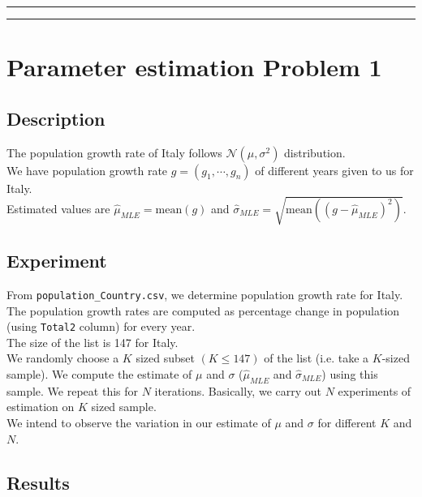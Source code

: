 \documentclass[fleqn, 11pt]{article}
\newcommand{\myline}{
    \par
    \kern3pt %
    \hrule height 0.5pt
    \kern2pt %
    \hrule height 0.5pt
    \kern3pt %
    \par
}
\begin{document}
\vspace{7pt}
\myline


\newpage
\section{Parameter estimation Problem 1}
\setcounter{figure}{0}
\subsection{Description}
The population growth rate of Italy follows $\mathcal{N}(\mu, \sigma^2)$ distribution. \\
We have population growth rate $g = (g_1, \cdots ,g_n)$ of different years given to us for Italy. \\
Estimated values are $\hat{\mu}_{MLE} = \mathrm{mean}(g)$ and $\hat{\sigma}_{MLE} = \sqrt{ \mathrm{mean}((g - \hat{\mu}_{MLE})^2) }$.

\subsection{Experiment}
From \verb!population_Country.csv!, we determine population growth rate for Italy. \\
The population growth rates are computed as percentage change in population (using \verb!Total2! column) for every year. \\
The size of the list is 147 for Italy. \\
We randomly choose a $K$ sized subset $(K \le 147)$ of the list (i.e. take a $K$-sized sample). We compute the estimate of $\mu$ and $\sigma$ ($\hat{\mu}_{MLE}$ and $\hat{\sigma}_{MLE}$) using this sample. We repeat this for $N$ iterations. Basically, we carry out $N$ experiments of estimation on $K$ sized sample. \\
We intend to observe the variation in our estimate of $\mu$ and $\sigma$ for different $K$ and $N$.

\subsection{Results}
\end{document}
